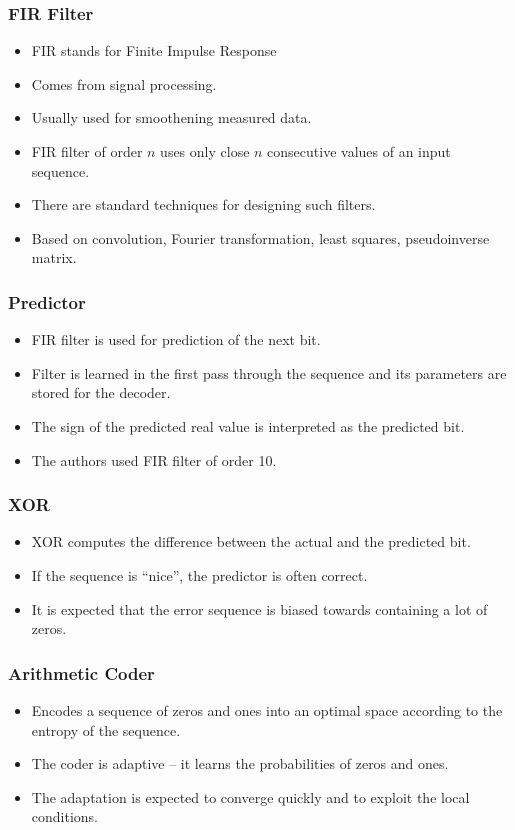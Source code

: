 \documentclass[hyperref={colorlinks=true}]{beamer}
\begin{document}
\begin{frame}
\frametitle{FIR Filter}

\begin{itemize}
	\item FIR stands for Finite Impulse Response
	\item Comes from signal processing.
	\item Usually used for smoothening measured data.
	\item FIR filter of order $n$ uses only close $n$ consecutive values of an input sequence.
	\item There are standard techniques for designing such filters.
	\item Based on convolution, Fourier transformation, least squares, pseudoinverse matrix.
\end{itemize}

\end{frame}

\begin{frame}
\frametitle{Predictor}

\begin{itemize}
	\item FIR filter is used for prediction of the next bit.
	\item Filter is learned in the first pass through the sequence and its parameters are stored for the decoder.
	\item The sign of the predicted real value is interpreted as the predicted bit.
	\item The authors used FIR filter of order 10.
\end{itemize}	

\end{frame}

\begin{frame}
\frametitle{XOR}

\begin{itemize}
	\item XOR computes the difference between the actual and the predicted bit.
	\item If the sequence is ``nice'', the predictor is often correct.
	\item It is expected that the error sequence is biased towards containing a lot of zeros.
\end{itemize}

\end{frame}

\begin{frame}
\frametitle{Arithmetic Coder}

\begin{itemize}
	\item Encodes a sequence of zeros and ones into an optimal space according to the entropy of the sequence.
	\item The coder is adaptive -- it learns the probabilities of zeros and ones.
	\item The adaptation is expected to converge quickly and to exploit the local conditions.
\end{itemize}

\end{frame}
\end{document}
